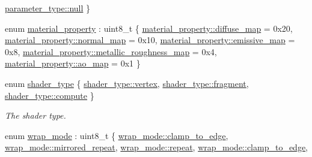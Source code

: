\begin{DoxyCompactItemize}
\mbox{\hyperlink{namespacemoka_aed2224bc0e5b79e57a8975ded94ee1aaa37a6259cc0c1dae299a7866489dff0bd}{parameter\+\_\+type\+::null}}
 \}
\item 
enum \mbox{\hyperlink{namespacemoka_aa5549e36b096ef61aaa3dbcdade25195}{material\+\_\+property}} \+: uint8\+\_\+t \{ \newline
\mbox{\hyperlink{namespacemoka_aa5549e36b096ef61aaa3dbcdade25195aa602f146f9a712de12f1b862df120e09}{material\+\_\+property\+::diffuse\+\_\+map}} = 0x20, 
\mbox{\hyperlink{namespacemoka_aa5549e36b096ef61aaa3dbcdade25195a05bbeeeb0001d6e5a5cfbf30ee1991a6}{material\+\_\+property\+::normal\+\_\+map}} = 0x10, 
\mbox{\hyperlink{namespacemoka_aa5549e36b096ef61aaa3dbcdade25195a87a383abca55fc2189048fc791143a9b}{material\+\_\+property\+::emissive\+\_\+map}} = 0x8, 
\mbox{\hyperlink{namespacemoka_aa5549e36b096ef61aaa3dbcdade25195a3a7f848c6cf95f80eeda6d1c63e0e5e7}{material\+\_\+property\+::metallic\+\_\+roughness\+\_\+map}} = 0x4, 
\newline
\mbox{\hyperlink{namespacemoka_aa5549e36b096ef61aaa3dbcdade25195aac1d1dda56a79f972e308442c494f9fb}{material\+\_\+property\+::ao\+\_\+map}} = 0x1
 \}
\item 
enum \mbox{\hyperlink{namespacemoka_a472008f32e5db526d38eace7d3e45772}{shader\+\_\+type}} \{ \mbox{\hyperlink{namespacemoka_a472008f32e5db526d38eace7d3e45772a2b5bc093b09bd81f51de433bde9d202a}{shader\+\_\+type\+::vertex}}, 
\mbox{\hyperlink{namespacemoka_a472008f32e5db526d38eace7d3e45772a02e918fc72837d7c2689be88684dceb1}{shader\+\_\+type\+::fragment}}, 
\mbox{\hyperlink{namespacemoka_a472008f32e5db526d38eace7d3e45772a77e73f3a185e16d1f08ca5e057710b9d}{shader\+\_\+type\+::compute}}
 \}
\begin{DoxyCompactList}\small\item\em The shader type. \end{DoxyCompactList}\item 
enum \mbox{\hyperlink{namespacemoka_afda3faa87bacaacc6008d8c1f73f6462}{wrap\+\_\+mode}} \+: uint8\+\_\+t \{ \newline
\mbox{\hyperlink{namespacemoka_afda3faa87bacaacc6008d8c1f73f6462a7ff5ead6fef18ca5f63119754ac76c3e}{wrap\+\_\+mode\+::clamp\+\_\+to\+\_\+edge}}, 
\mbox{\hyperlink{namespacemoka_afda3faa87bacaacc6008d8c1f73f6462a301defc6e7425fc63ef35c7827d43b44}{wrap\+\_\+mode\+::mirrored\+\_\+repeat}}, 
\mbox{\hyperlink{namespacemoka_afda3faa87bacaacc6008d8c1f73f6462a32cf6da134a8b268cf4ab6b79a9a5ad9}{wrap\+\_\+mode\+::repeat}}, 
\mbox{\hyperlink{namespacemoka_afda3faa87bacaacc6008d8c1f73f6462a7ff5ead6fef18ca5f63119754ac76c3e}{wrap\+\_\+mode\+::clamp\+\_\+to\+\_\+edge}}, 

\end{DoxyCompactItemize}
